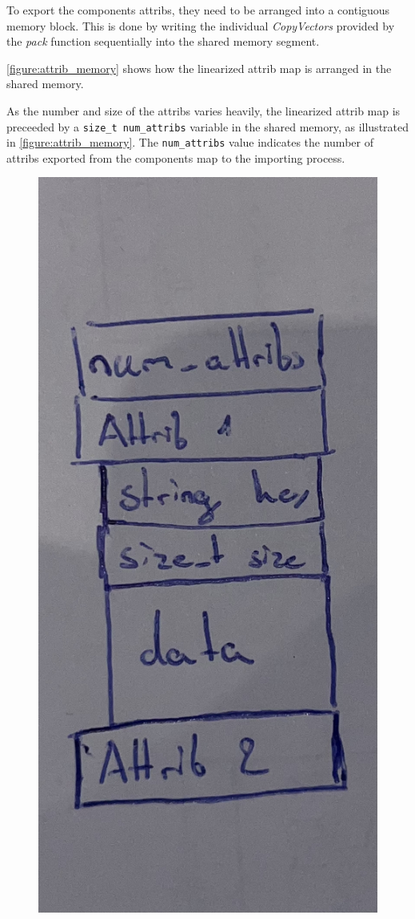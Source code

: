 To export the components attribs, they need to be arranged into a contiguous memory block.
This is done by writing the individual \emph{CopyVectors} provided by the \emph{pack} function sequentially into the shared memory segment.

\autoref{figure:attrib_memory} shows how the linearized attrib map is arranged in the shared memory.

As the number and size of the attribs varies heavily, the linearized attrib map is preceeded by a \lstinline|size_t num_attribs| variable in the shared memory,
as illustrated in \autoref{figure:attrib_memory}.
The \lstinline|num_attribs| value indicates the number of attribs exported from the components map to the importing process.

\begin{figure}[!ht]
    \includegraphics[scale=0.1]{images/attrib_memory.jpg} %

\end{figure}
